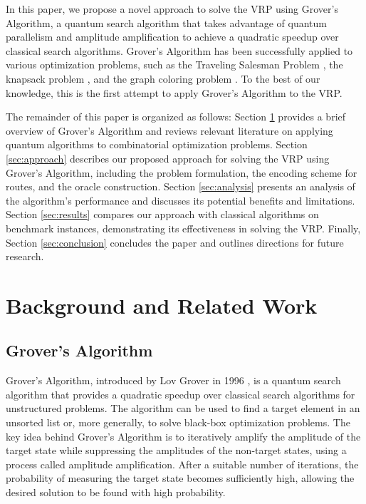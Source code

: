 In this paper, we propose a novel approach to solve the VRP using Grover's Algorithm, a quantum search algorithm that takes advantage of quantum parallelism and amplitude amplification to achieve a quadratic speedup over classical search algorithms. Grover's Algorithm has been successfully applied to various optimization problems, such as the Traveling Salesman Problem \cite{zak2018}, the knapsack problem \cite{montanaro2016}, and the graph coloring problem \cite{childs2018}. To the best of our knowledge, this is the first attempt to apply Grover's Algorithm to the VRP.

The remainder of this paper is organized as follows: Section \ref{sec:background} provides a brief overview of Grover's Algorithm and reviews relevant literature on applying quantum algorithms to combinatorial optimization problems. Section \ref{sec:approach} describes our proposed approach for solving the VRP using Grover's Algorithm, including the problem formulation, the encoding scheme for routes, and the oracle construction. Section \ref{sec:analysis} presents an analysis of the algorithm's performance and discusses its potential benefits and limitations. Section \ref{sec:results} compares our approach with classical algorithms on benchmark instances, demonstrating its effectiveness in solving the VRP. Finally, Section \ref{sec:conclusion} concludes the paper and outlines directions for future research.

\section{Background and Related Work}
\label{sec:background}

\subsection{Grover's Algorithm}

Grover's Algorithm, introduced by Lov Grover in 1996 \cite{grover1996}, is a quantum search algorithm that provides a quadratic speedup over classical search algorithms for unstructured problems. The algorithm can be used to find a target element in an unsorted list or, more generally, to solve black-box optimization problems. The key idea behind Grover's Algorithm is to iteratively amplify the amplitude of the target state while suppressing the amplitudes of the non-target states, using a process called amplitude amplification. After a suitable number of iterations, the probability of measuring the target state becomes sufficiently high, allowing the desired solution to be found with high probability.

